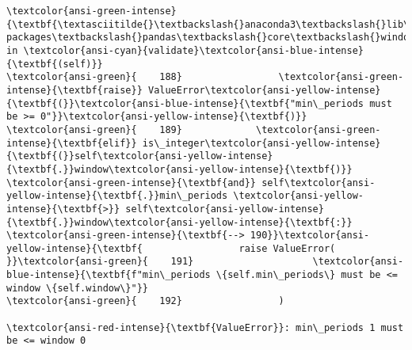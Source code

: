 \documentclass[11pt]{article}
\makeatletter
\newcommand{\boxspacing}{\kern\kvtcb@left@rule\kern\kvtcb@boxsep}
\newcommand{\prompt}[4]{
        {\ttfamily\llap{{\color{#2}[#3]:\hspace{3pt}#4}}\vspace{-\baselineskip}}
    }
\makeatother
\begin{document}
\begin{Verbatim}[commandchars=\\\{\}, frame=single, framerule=2mm, rulecolor=\color{outerrorbackground}]
\textcolor{ansi-green-intense}{\textbf{\textasciitilde{}\textbackslash{}anaconda3\textbackslash{}lib\textbackslash{}site-packages\textbackslash{}pandas\textbackslash{}core\textbackslash{}window\textbackslash{}rolling.py}} in \textcolor{ansi-cyan}{validate}\textcolor{ansi-blue-intense}{\textbf{(self)}}
\textcolor{ansi-green}{    188}                 \textcolor{ansi-green-intense}{\textbf{raise}} ValueError\textcolor{ansi-yellow-intense}{\textbf{(}}\textcolor{ansi-blue-intense}{\textbf{"min\_periods must be >= 0"}}\textcolor{ansi-yellow-intense}{\textbf{)}}
\textcolor{ansi-green}{    189}             \textcolor{ansi-green-intense}{\textbf{elif}} is\_integer\textcolor{ansi-yellow-intense}{\textbf{(}}self\textcolor{ansi-yellow-intense}{\textbf{.}}window\textcolor{ansi-yellow-intense}{\textbf{)}} \textcolor{ansi-green-intense}{\textbf{and}} self\textcolor{ansi-yellow-intense}{\textbf{.}}min\_periods \textcolor{ansi-yellow-intense}{\textbf{>}} self\textcolor{ansi-yellow-intense}{\textbf{.}}window\textcolor{ansi-yellow-intense}{\textbf{:}}
\textcolor{ansi-green-intense}{\textbf{--> 190}}\textcolor{ansi-yellow-intense}{\textbf{                 raise ValueError(
}}\textcolor{ansi-green}{    191}                     \textcolor{ansi-blue-intense}{\textbf{f"min\_periods \{self.min\_periods\} must be <= window \{self.window\}"}}
\textcolor{ansi-green}{    192}                 )

\textcolor{ansi-red-intense}{\textbf{ValueError}}: min\_periods 1 must be <= window 0
    \end{Verbatim}

    \begin{tcolorbox}[breakable, size=fbox, boxrule=1pt, pad at break*=1mm,colback=cellbackground, colframe=cellborder]
\prompt{In}{incolor}{ }{\boxspacing}
\begin{Verbatim}[commandchars=\\\{\}]

\end{Verbatim}
\end{tcolorbox}


    
    
    
\end{document}
